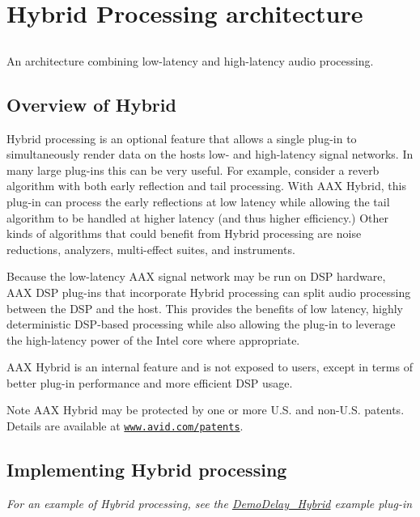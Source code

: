 \hypertarget{a00335}{}\section{Hybrid Processing architecture}
\label{a00335}


\subsection{ }
An architecture combining low-\/latency and high-\/latency audio processing. 

 \hypertarget{a00335_additionalFeatures_Hybrid_overview}{}\subsection{Overview of Hybrid}\label{a00335_additionalFeatures_Hybrid_overview}
Hybrid processing is an optional feature that allows a single plug-\/in to simultaneously render data on the host\textquotesingle{}s low-\/ and high-\/latency signal networks. In many large plug-\/ins this can be very useful. For example, consider a reverb algorithm with both early reflection and tail processing. With A\+A\+X Hybrid, this plug-\/in can process the early reflections at low latency while allowing the tail algorithm to be handled at higher latency (and thus higher efficiency.) Other kinds of algorithms that could benefit from Hybrid processing are noise reductions, analyzers, multi-\/effect suites, and instruments.

Because the low-\/latency A\+A\+X signal network may be run on D\+S\+P hardware, A\+A\+X D\+S\+P plug-\/ins that incorporate Hybrid processing can split audio processing between the D\+S\+P and the host. This provides the benefits of low latency, highly deterministic D\+S\+P-\/based processing while also allowing the plug-\/in to leverage the high-\/latency power of the Intel core where appropriate.

A\+A\+X Hybrid is an internal feature and is not exposed to users, except in terms of better plug-\/in performance and more efficient D\+S\+P usage.

\begin{DoxyNote}{Note}
A\+A\+X Hybrid may be protected by one or more U.\+S. and non-\/\+U.\+S. patents. Details are available at \href{https://www.avid.com/patents}{\tt www.\+avid.\+com/patents}.
\end{DoxyNote}
\hypertarget{a00335_additionalFeatures_Hybrid_adding}{}\subsection{Implementing Hybrid processing}\label{a00335_additionalFeatures_Hybrid_adding}
{\itshape For an example of Hybrid processing, see the \hyperlink{a00376_DemoDelay_Hybrid}{Demo\+Delay\+\_\+\+Hybrid} example plug-\/in}

